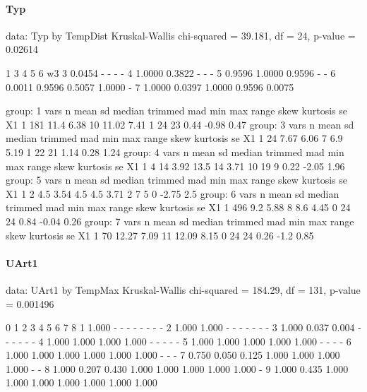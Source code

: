 \documentclass[a4paper,headsepline,footsepline,fontsize=11pt,BCOR=12mm,DIV=12]{report}
\begin{document}
\paragraph{Typ}

data:  Typ by TempDist
Kruskal-Wallis chi-squared = 39.181, df = 24, p-value = 0.02614

  1      3      4      5      6  w3   
3 0.0454 -      -      -      -     
4 1.0000 0.3822 -      -      -     
5 0.9596 1.0000 0.9596 -      -     
6 0.0011 0.9596 0.5057 1.0000 -     
7 1.0000 0.0397 1.0000 0.9596 0.0075

group: 1
   vars   n mean   sd median trimmed  mad min max range skew kurtosis   se
X1    1 181 11.4 6.38     10   11.02 7.41   1  24    23 0.44    -0.98 0.47
group: 3
   vars  n mean   sd median trimmed  mad min max range skew kurtosis   se
X1    1 24 7.67 6.06      7     6.9 5.19   1  22    21 1.14     0.28 1.24
group: 4
   vars n mean   sd median trimmed  mad min max range skew kurtosis   se
X1    1 4   14 3.92   13.5      14 3.71  10  19     9 0.22    -2.05 1.96
group: 5
   vars n mean   sd median trimmed  mad min max range skew kurtosis  se
X1    1 2  4.5 3.54    4.5     4.5 3.71   2   7     5    0    -2.75 2.5
group: 6
   vars   n mean   sd median trimmed  mad min max range skew kurtosis   se
X1    1 496  9.2 5.88      8     8.6 4.45   0  24    24 0.84    -0.04 0.26
group: 7
   vars  n  mean   sd median trimmed  mad min max range skew kurtosis   se
X1    1 70 12.27 7.09     11   12.09 8.15   0  24    24 0.26     -1.2 0.85

\paragraph{UArt1}

data:  UArt1 by TempMax
Kruskal-Wallis chi-squared = 184.29, df = 131, p-value = 0.001496

  0     1     2     3     4     5     6     7     8    
1 1.000 -     -     -     -     -     -     -     -    
2 1.000 1.000 -     -     -     -     -     -     -    
3 1.000 0.037 0.004 -     -     -     -     -     -    
4 1.000 1.000 1.000 1.000 -     -     -     -     -    
5 1.000 1.000 1.000 1.000 1.000 -     -     -     -    
6 1.000 1.000 1.000 1.000 1.000 1.000 -     -     -    
7 0.750 0.050 0.125 1.000 1.000 1.000 1.000 -     -    
8 1.000 0.207 0.430 1.000 1.000 1.000 1.000 1.000 -    
9 1.000 0.435 1.000 1.000 1.000 1.000 1.000 1.000 1.000
\end{document}
